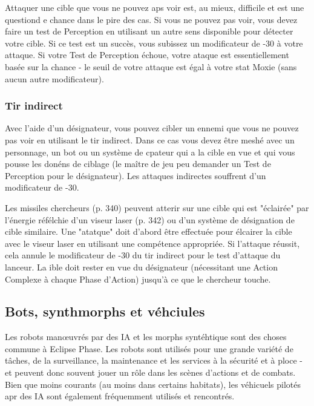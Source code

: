 Attaquer une cible que vous ne pouvez aps voir est, au mieux, difficile et est une questiond e chance dans le pire des cas. Si vous ne pouvez pas voir, vous devez faire un test de Perception en utilisant un autre sens disponible pour détecter votre cible. Si ce test est un succès, vous subissez un modificateur de -30 à votre attaque. Si votre Test de Perception échoue, votre ataque est essentiellement basée sur la chance - le seuil de votre attaque est égal à votre stat Moxie (sans aucun autre modificateur). 

\subsubsection{Tir indirect} 

Avec l'aide d'un désignateur, vous pouvez cibler un ennemi que vous ne pouvez pas voir en utilisant le tir indirect. Dans ce cas vous devez être meshé avec un personnage, un bot ou un système de cpateur qui a la cible en vue et qui vous pousse les donéns de ciblage (le maître de jeu peu demander un Test de Perception pour le désignateur). Les attaques indirectes souffrent d'un modificateur de -30. 

Les missiles chercheurs (p. 340) peuvent atterir sur une cible qui est "éclairée" par l'énergie réfélchie d'un viseur laser (p. 342) ou d'un système de désignation de cible similaire. Une "atatque" doit d'abord être effectuée pour élcairer la cible avec le viseur laser en utilisant une compétence appropriée. Si l'attaque réussit, cela annule le modificateur de -30 du tir indirect pour le test d'attaque du lanceur. La ible doit rester en vue du désignateur (nécessitant une Action Complexe à chaque Phase d'Action) jusqu'à ce que le chercheur touche. 



\subsection{Bots, synthmorphs et véhciules} \label{sec:bots-synthmorphs-vehicles} 

Les robots manœuvrés par des IA et les morphs syntéhtique sont des choses commune à Eclipse Phase. Les robots sont utilisés pour une grande variété de tâches, de la surveillance, la maintenance et les services à la sécurité et à ploce - et peuvent donc souvent jouer un rôle dans les scènes d'actions et de combats. Bien que moins courants (au moins dans certains habitats), les véhicuels pilotés apr des IA sont également fréquemment utilisés et rencontrés. 

